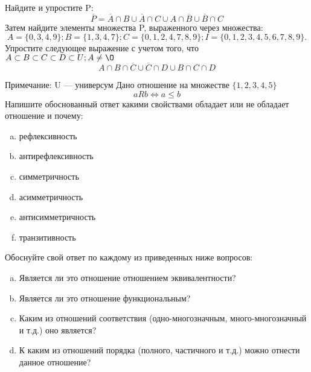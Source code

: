 \documentclass[10pt]{exam}
\begin{document}
\begin{questions}
\question
Найдите и упростите P:
\begin{equation*}
\overline{P} = \overline{A} \cap B \cup \overline{A} \cap C \cup A \cap \overline{B} \cup \overline{B} \cap C
\end{equation*}
Затем найдите элементы множества P, выраженного через множества:
\begin{equation*}
A = \{0, 3, 4, 9\}; 
B = \{1, 3, 4, 7\};
C = \{0, 1, 2, 4, 7, 8, 9\};
I = \{0, 1, 2, 3, 4, 5, 6, 7, 8, 9\}.
\end{equation*}\question
Упростите следующее выражение с учетом того, что $A\subset B \subset C \subset D \subset U; A \neq \O$
\begin{equation*}
A \cap B  \cap \overline{C} \cup \overline{C} \cap D \cup B \cap C \cap D
\end{equation*}

Примечание: U — универсум\question
Дано отношение на множестве $\{1, 2, 3, 4, 5\}$ 
\begin{equation*}
aRb \iff a \leq b
\end{equation*}
Напишите обоснованный ответ какими свойствами обладает или не обладает отношение и почему:   
\begin{enumerate} [a)]\setcounter{enumi}{0}
\item рефлексивность
\item антирефлексивность
\item симметричность
\item асимметричность
\item антисимметричность
\item транзитивность
\end{enumerate}

Обоснуйте свой ответ по каждому из приведенных ниже вопросов:
\begin{enumerate} [a)]\setcounter{enumi}{0}
    \item Является ли это отношение отношением эквивалентности?
    \item Является ли это отношение функциональным?
    \item Каким из отношений соответствия (одно-многозначным, много-многозначный и т.д.) оно является?
    \item К каким из отношений порядка (полного, частичного и т.д.) можно отнести данное отношение?
\end{enumerate}



\end{questions}
\end{document}
